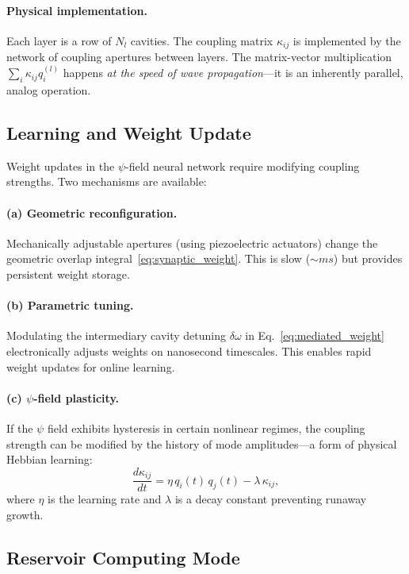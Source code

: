 \documentclass[12pt,a4paper,twoside]{article}
\begin{document}
\paragraph{Physical implementation.} Each layer is a row of $N_l$ cavities. The coupling matrix $\kappa_{ij}$ is implemented by the network of coupling apertures between layers. The matrix-vector multiplication $\sum_i \kappa_{ij} q_i^{(l)}$ happens \emph{at the speed of wave propagation}---it is an inherently parallel, analog operation.

\subsection{Learning and Weight Update}\label{sec:learning}

Weight updates in the $\psi$-field neural network require modifying coupling strengths. Two mechanisms are available:

\paragraph{(a) Geometric reconfiguration.} Mechanically adjustable apertures (using piezoelectric actuators) change the geometric overlap integral~\eqref{eq:synaptic_weight}. This is slow ($\sim \si{ms}$) but provides persistent weight storage.

\paragraph{(b) Parametric tuning.} Modulating the intermediary cavity detuning $\delta\omega$ in Eq.~\eqref{eq:mediated_weight} electronically adjusts weights on nanosecond timescales. This enables rapid weight updates for online learning.

\paragraph{(c) $\psi$-field plasticity.} If the $\psi$ field exhibits hysteresis in certain nonlinear regimes, the coupling strength can be modified by the history of mode amplitudes---a form of physical Hebbian learning:
\begin{equation}
\frac{d\kappa_{ij}}{dt} = \eta\,q_i(t)\,q_j(t) - \lambda\,\kappa_{ij},
\label{eq:hebbian}
\end{equation}
where $\eta$ is the learning rate and $\lambda$ is a decay constant preventing runaway growth.

\subsection{Reservoir Computing Mode}\label{sec:reservoir}
\end{document}
